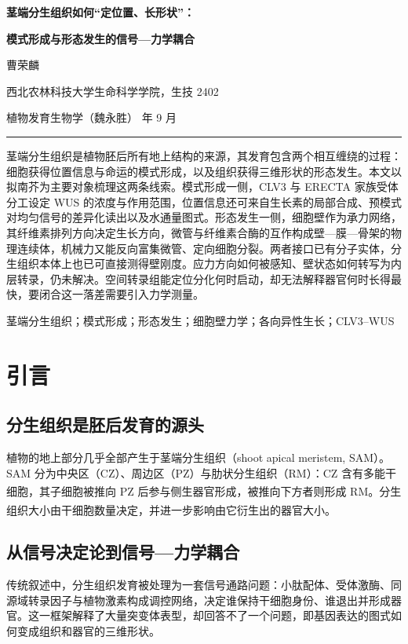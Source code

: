 \documentclass[11pt,a4paper]{ctexart}
\newcommand{\papertitle}{%
  \begin{center}
    {\sffamily\bfseries\Large 茎端分生组织如何“定位置、长形状”：\par}
    \vspace{2pt}
    {\sffamily\bfseries\Large 模式形成与形态发生的信号—力学耦合\par}
    \vspace{11pt}
    {\large 曹荣麟\par}
    \vspace{4pt}
    {\small 西北农林科技大学生命科学学院，生技 2402\par}
    \vspace{6pt}
    {\small\color{gray} 植物发育生物学（魏永胜）\quad 2026 年 9 月\par}
    \vspace{9pt}
    \rule{\linewidth}{0.6pt}
  \end{center}
  \vspace{5pt}
}
\begin{document}
\papertitle

\begin{abstractbox}
\par\vspace{2pt}

茎端分生组织是植物胚后所有地上结构的来源，其发育包含两个相互缠绕的过程：细胞获得位置信息与命运的模式形成，以及组织获得三维形状的形态发生。本文以拟南芥为主要对象梳理这两条线索。模式形成一侧，CLV3 与 ERECTA 家族受体分工设定 WUS 的浓度与作用范围，位置信息还可来自生长素的局部合成、预模式对均匀信号的差异化读出以及水通量图式。形态发生一侧，细胞壁作为承力网络，其纤维素排列方向决定生长方向，微管与纤维素合酶的互作构成壁—膜—骨架的物理连续体，机械力又能反向富集微管、定向细胞分裂。两者接口已有分子实体，分生组织本体上也已可直接测得壁刚度。应力方向如何被感知、壁状态如何转写为内层转录，仍未解决。空间转录组能定位分化何时启动，却无法解释器官何时长得最快，要闭合这一落差需要引入力学测量。
\vspace{6pt}
\par\vspace{2pt}

茎端分生组织；模式形成；形态发生；细胞壁力学；各向异性生长；CLV3–WUS
\end{abstractbox}

\section{引言}

\subsection{分生组织是胚后发育的源头}

植物的地上部分几乎全部产生于茎端分生组织（shoot apical meristem, SAM）。SAM 分为中央区（CZ）、周边区（PZ）与肋状分生组织（RM）：CZ 含有多能干细胞，其子细胞被推向 PZ 后参与侧生器官形成，被推向下方者则形成 RM\textsuperscript{\cite{ref1,ref2}}。分生组织大小由干细胞数量决定，并进一步影响由它衍生出的器官大小\textsuperscript{\cite{ref1}}。

\subsection{从信号决定论到信号—力学耦合}

传统叙述中，分生组织发育被处理为一套信号通路问题：小肽配体、受体激酶、同源域转录因子与植物激素构成调控网络，决定谁保持干细胞身份、谁退出并形成器官。这一框架解释了大量突变体表型，却回答不了一个问题，即基因表达的图式如何变成组织和器官的三维形状。
\end{document}
